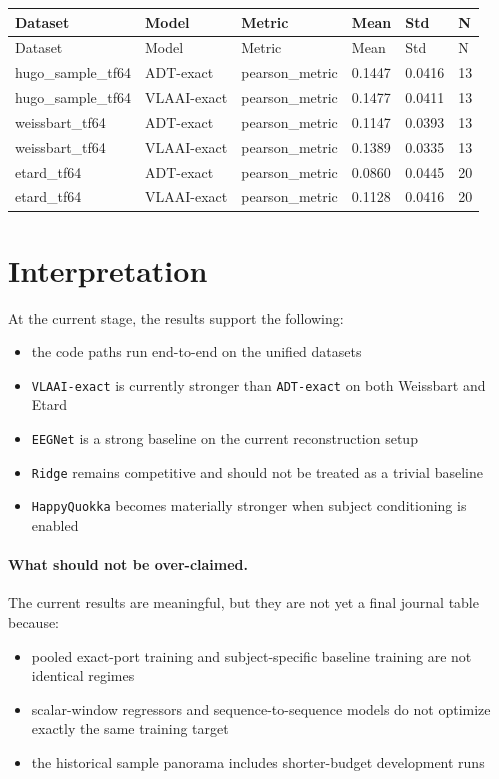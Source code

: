 \documentclass[11pt]{article}
\begin{document}
\begin{longtable}{p{2.2cm} p{2.0cm} p{2.3cm} p{1.2cm} p{1.2cm} p{0.9cm}}
\toprule
Dataset & Model & Metric & Mean & Std & N \\
\midrule
\endfirsthead
\toprule
Dataset & Model & Metric & Mean & Std & N \\
\midrule
\endhead
hugo\_sample\_tf64 & ADT-exact & pearson\_metric & 0.1447 & 0.0416 & 13 \\
hugo\_sample\_tf64 & VLAAI-exact & pearson\_metric & 0.1477 & 0.0411 & 13 \\
weissbart\_tf64 & ADT-exact & pearson\_metric & 0.1147 & 0.0393 & 13 \\
weissbart\_tf64 & VLAAI-exact & pearson\_metric & 0.1389 & 0.0335 & 13 \\
etard\_tf64 & ADT-exact & pearson\_metric & 0.0860 & 0.0445 & 20 \\
etard\_tf64 & VLAAI-exact & pearson\_metric & 0.1128 & 0.0416 & 20 \\
\bottomrule
\end{longtable}

\section*{Interpretation}
At the current stage, the results support the following:
\begin{itemize}
\item the code paths run end-to-end on the unified datasets
\item \texttt{VLAAI-exact} is currently stronger than \texttt{ADT-exact} on both Weissbart and Etard
\item \texttt{EEGNet} is a strong baseline on the current reconstruction setup
\item \texttt{Ridge} remains competitive and should not be treated as a trivial baseline
\item \texttt{HappyQuokka} becomes materially stronger when subject conditioning is enabled
\end{itemize}

\paragraph{What should not be over-claimed.}
The current results are meaningful, but they are not yet a final journal table because:
\begin{itemize}
\item pooled exact-port training and subject-specific baseline training are not identical regimes
\item scalar-window regressors and sequence-to-sequence models do not optimize exactly the same training target
\item the historical sample panorama includes shorter-budget development runs
\end{itemize}
\end{document}
